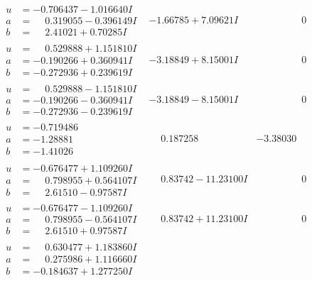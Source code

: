 \documentclass[1p]{elsarticle_modified}
\theoremstyle{definition}
\begin{document}
$$\begin{array}{c|c|c}
\begin{aligned}
u &= -0.706437 - 1.016640 I \\
a &= \phantom{-}0.319055 - 0.396149 I \\
b &= \phantom{-}2.41021 + 0.70285 I\end{aligned}
 & -1.66785 + 7.09621 I & \phantom{-0.000000 } 0 \\ \hline\begin{aligned}
u &= \phantom{-}0.529888 + 1.151810 I \\
a &= -0.190266 + 0.360941 I \\
b &= -0.272936 + 0.239619 I\end{aligned}
 & -3.18849 + 8.15001 I & \phantom{-0.000000 } 0 \\ \hline\begin{aligned}
u &= \phantom{-}0.529888 - 1.151810 I \\
a &= -0.190266 - 0.360941 I \\
b &= -0.272936 - 0.239619 I\end{aligned}
 & -3.18849 - 8.15001 I & \phantom{-0.000000 } 0 \\ \hline\begin{aligned}
u &= -0.719486\phantom{ +0.000000I} \\
a &= -1.28881\phantom{ +0.000000I} \\
b &= -1.41026\phantom{ +0.000000I}\end{aligned}
 & \phantom{-}0.187258\phantom{ +0.000000I} & -3.38030\phantom{ +0.000000I} \\ \hline\begin{aligned}
u &= -0.676477 + 1.109260 I \\
a &= \phantom{-}0.798955 + 0.564107 I \\
b &= \phantom{-}2.61510 - 0.97587 I\end{aligned}
 & \phantom{-}0.83742 - 11.23100 I & \phantom{-0.000000 } 0 \\ \hline\begin{aligned}
u &= -0.676477 - 1.109260 I \\
a &= \phantom{-}0.798955 - 0.564107 I \\
b &= \phantom{-}2.61510 + 0.97587 I\end{aligned}
 & \phantom{-}0.83742 + 11.23100 I & \phantom{-0.000000 } 0 \\ \hline\begin{aligned}
u &= \phantom{-}0.630477 + 1.183860 I \\
a &= \phantom{-}0.275986 + 1.116660 I \\
b &= -0.184637 + 1.277250 I\end{aligned}

\end{array}$$
\end{document}
